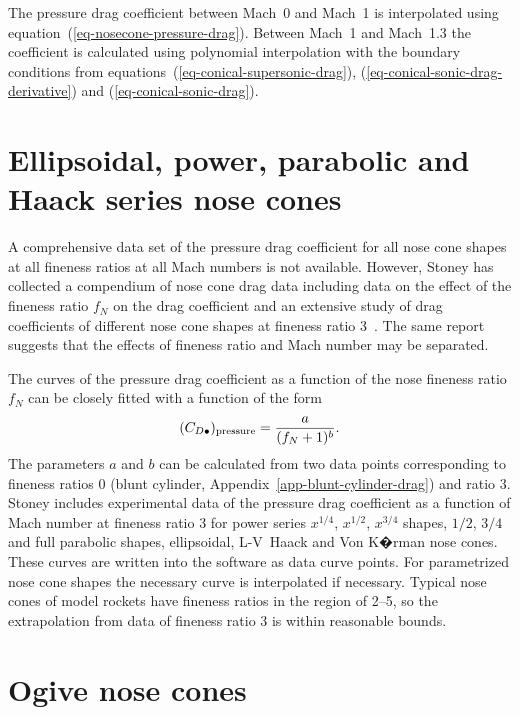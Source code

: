 The pressure drag coefficient between Mach~0 and Mach~1 is
interpolated using equation~(\ref{eq-nosecone-pressure-drag}).  
Between Mach~1 and Mach~1.3 the coefficient is calculated using
polynomial interpolation with the boundary conditions from
equations~(\ref{eq-conical-supersonic-drag}),
(\ref{eq-conical-sonic-drag-derivative}) and
(\ref{eq-conical-sonic-drag}).






\section{Ellipsoidal, power, parabolic and Haack series nose cones}
\label{app-haack-series-pressure-drag}

A comprehensive data set of the pressure drag coefficient for all nose
cone shapes at all fineness ratios at all Mach numbers is not
available.  However, Stoney has collected a compendium of nose cone
drag data including data on the effect of the fineness ratio $f_N$ on
the drag coefficient and an extensive study of drag coefficients of
different nose cone shapes at fineness ratio
3~\cite{nosecone-cd-data}.  The same report suggests that the effects 
of fineness ratio and Mach number may be separated.

The curves of the pressure drag coefficient as a function of the nose
fineness ratio $f_N$ can be closely fitted with a function of the form
%
\begin{equation}
(C_{D\bullet})_{\rm pressure} = \frac{a}{(f_N + 1)^b}.
\label{eq-fineness-ratio-drag-interpolator}
\end{equation}
%
The parameters $a$ and $b$ can be calculated from two data points
corresponding to fineness ratios 0 (blunt cylinder,
Appendix~\ref{app-blunt-cylinder-drag}) and ratio 3.  Stoney includes
experimental data of the pressure drag coefficient as a function of
Mach number at fineness ratio 3 for power series $x^{1/4}$, $x^{1/2}$,
$x^{3/4}$ shapes, $1/2$, $3/4$ and full parabolic shapes, ellipsoidal,
L-V~Haack and Von K�rman nose cones.  These curves are written into
the software as data curve points.  For parametrized nose cone shapes
the necessary curve is interpolated if 
necessary.  Typical nose cones of model rockets have fineness ratios
in the region of 2--5, so the extrapolation from data of fineness
ratio 3 is within reasonable bounds.





\section{Ogive nose cones}


